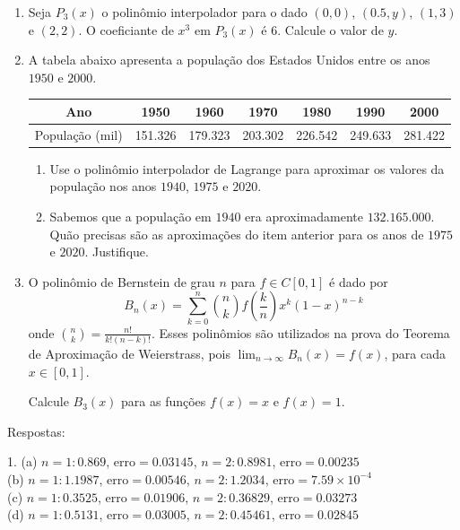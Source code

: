 \documentclass{article}
\newcommand{\ds}{\displaystyle}
\begin{document}
\begin{enumerate}
	\item Seja $P_3(x)$ o polin\^omio interpolador para o dado $(0,0)$, $(0.5,
		y)$, $(1,3)$ e $(2,2)$. O coeficiante de $x^3$ em $P_3(x)$ \'e $6$.
		Calcule o valor de $y$.

	\item A tabela abaixo apresenta a popula\c{c}\~ao dos Estados Unidos entre os
		anos $1950$ e $2000$.

		\begin{table}
			\begin{tabular}{c|c|c|c|c|c|c}  %
				Ano & 1950 & 1960 & 1970 & 1980 & 1990 & 2000 \\
				\hline{}  %
				Popula\c{c}\~ao (mil) & 151.326 & 179.323 & 203.302 &
				226.542 & 249.633 & 281.422
			\end{tabular}
		\end{table}
		
		\begin{enumerate}
			\item Use o polin\^omio interpolador de Lagrange para aproximar os
				valores da popula\c{c}\~ao nos anos $1940$, $1975$ e $2020$.
			\item Sabemos que a popula\c{c}\~ao em $1940$ era aproximadamente
				$132.165.000$. Qu\~ao precisas s\~ao as aproxima\c{c}\~oes do item
				anterior para os anos de $1975$ e $2020$. Justifique.
		\end{enumerate}

	\item O polin\^omio de Bernstein de grau $n$ para $f\in{}C[0,1]$ \'e dado por
		\[B_n(x) = \sum_{k=0}^n
			\binom{n}{k}f\left(\frac{k}{n}\right)x^k{(1-x)}^{n-k}\]
		onde $\binom{n}{k}=\frac{n!}{k!(n-k)!}$. Esses polin\^omios s\~ao
		utilizados na prova do Teorema de Aproxima\c{c}\~ao de Weierstrass, pois
		$\ds\lim_{n\rightarrow{}\infty} B_n(x) = f(x)$, para cada
		$x\in{}[0,1]$.

		Calcule $B_3(x)$ para as fun\c{c}\~oes $f(x) = x$ e $f(x) = 1$.
\end{enumerate}

Respostas:

\noindent{}1. (a) $n=1: 0.869$, erro$=0.03145$, $n=2: 0.8981$, erro$=0.00235$\\
(b) $n=1: 1.1987$, erro$=0.00546$, $n=2: 1.2034$, erro$=7.59\times{}10^{-4}$\\
(c) $n=1: 0.3525$, erro$=0.01906$, $n=2: 0.36829$, erro$=0.03273$\\
(d) $n=1: 0.5131$, erro$=0.03005$, $n=2: 0.45461$, erro$=0.02845$
\end{document}
